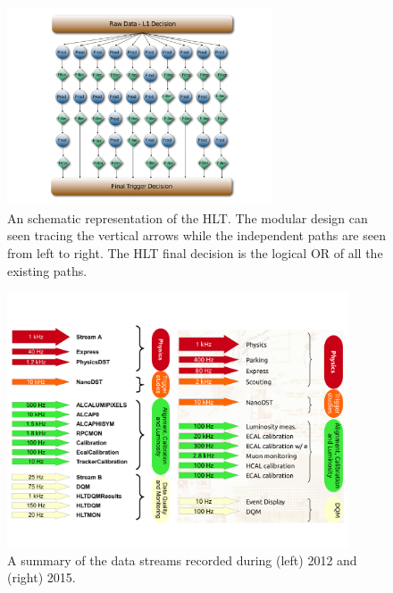 \begin{figure}
 \centering
\includegraphics[width=0.7\textwidth]{CMS_DetectorFigures/HLT_TriggerAlgo.pdf}
\caption{An schematic representation of the HLT. The modular design
  can seen tracing the vertical arrows while the independent paths
  are seen from left to right. The HLT final decision is the logical
  OR of all the existing paths.\label{fig:HLT}}
\end{figure}

\begin{figure}
 \centering
\includegraphics[width=0.9\textwidth]{CMS_DetectorFigures/HLT_Paths.pdf}
\caption{A summary of the data streams recorded during (left) 2012 and
  (right) 2015.\label{fig:HLT_Streams}}
\end{figure}